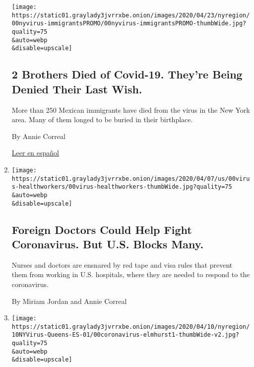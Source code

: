 \begin{enumerate}
  \texttt{[image: https://static01.graylady3jvrrxbe.onion/images/2020/04/23/nyregion/00nyvirus-immigrantsPROMO/00nyvirus-immigrantsPROMO-thumbWide.jpg?quality=75\\\&auto=webp\\\&disable=upscale]}

  \hypertarget{2-brothers-died-of-covid-19-theyre-being-denied-their-last-wish}{%
  \subsection{2 Brothers Died of Covid-19. They're Being Denied Their
  Last
  Wish.}\label{2-brothers-died-of-covid-19-theyre-being-denied-their-last-wish}}

  More than 250 Mexican immigrants have died from the virus in the New
  York area. Many of them longed to be buried in their birthplace.

  By Annie Correal

  \href{https://www.nytimes3xbfgragh.onion/es/2020/04/24/espanol/mundo/coronavirus-hermanos-nueva-york.html}{Leer
  en español}
\item
  \href{/2020/04/13/us/coronavirus-foreign-doctors-nurses-visas.html}{}

  \texttt{[image: https://static01.graylady3jvrrxbe.onion/images/2020/04/07/us/00virus-healthworkers/00virus-healthworkers-thumbWide.jpg?quality=75\\\&auto=webp\\\&disable=upscale]}

  \hypertarget{foreign-doctors-could-help-fight-coronavirus-but-us-blocks-many}{%
  \subsection{Foreign Doctors Could Help Fight Coronavirus. But U.S.
  Blocks
  Many.}\label{foreign-doctors-could-help-fight-coronavirus-but-us-blocks-many}}

  Nurses and doctors are ensnared by red tape and visa rules that
  prevent them from working in U.S. hospitals, where they are needed to
  respond to the coronavirus.

  By Miriam Jordan and Annie Correal
\item
  \href{/es/2020/04/10/espanol/mundo/coronavirus-queens-hospital-elmhurst-corona-jackson-heights.html}{}

  \texttt{[image: https://static01.graylady3jvrrxbe.onion/images/2020/04/10/nyregion/10NYVirus-Queens-ES-01/00coronavirus-elmhurst1-thumbWide-v2.jpg?quality=75\\\&auto=webp\\\&disable=upscale]}

  \hypertarget{se-estuxe1-viviendo-una-tragedia-en-el-epicentro-del-virus-en-nueva-york}{%
}
\end{enumerate}

